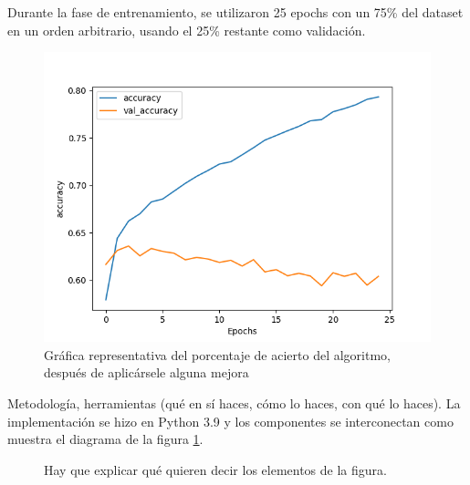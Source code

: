 \documentclass[a4]{sciposter}
\begin{document}
\begin{multicols}{2}
Durante la fase de entrenamiento, se utilizaron 25 epochs con un 75\% del dataset en un orden arbitrario, usando el 25\% restante como validación.

\begin{figure}
	\centering
	\captionsetup{type=figure}
	\setcounter{figure}{1}
	\includegraphics[scale=1.5]{img/Accuracy 2021-07.png}
	\caption{Gráfica representativa del porcentaje de acierto del algoritmo, después de aplicársele alguna mejora}
	
\end{figure}


Metodología, herramientas (qué en sí haces, cómo lo haces, con qué lo
haces).  La implementación se hizo en Python 3.9 \citep{python} y los
componentes se interconectan como muestra el diagrama de la figura
\ref{diag}.

\begin{figure}
\captionsetup{type=figure} %
\setcounter{figure}{1} %
\begin{center}
\end{center}
\caption{Hay que explicar qué quieren decir los elementos de la figura.}
\label{diag}
\end{figure}


\end{multicols}
\end{document}
